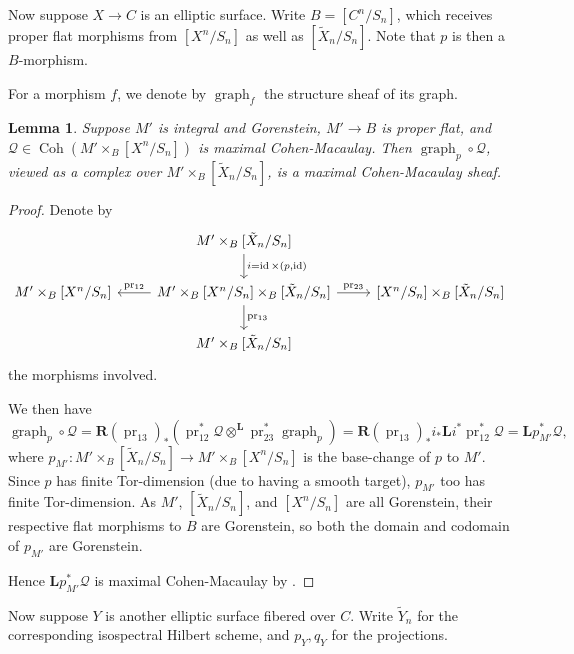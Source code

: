 \documentclass{amsart}
\theoremstyle{plain}
\newtheorem{lemma}[theorem]{Lemma}
\theoremstyle{definition}
\theoremstyle{remark}
\begin{document}
    Now suppose $X\to C$ is an elliptic surface.
    Write $B=[C^n/S_n]$, which receives proper flat morphisms from $[X^n/S_n]$ as well as $[\tilde{X}_n/S_n]$.
    Note that $p$ is then a $B$-morphism.

    For a morphism $f$, we denote by $\operatorname{graph}_f$ the structure sheaf of its graph.
    \begin{lemma}
        Suppose $M'$ is integral and Gorenstein, $M'\to B$ is proper flat, and $\mathcal Q\in\operatorname{Coh}(M'\times_B [X^n/S_n])$ is maximal Cohen-Macaulay.
        Then $\operatorname{graph}_p\circ \mathcal Q$, viewed as a complex over $M'\times_B[\tilde{X}_n/S_n]$, is a maximal Cohen-Macaulay sheaf.
    \end{lemma}
    \begin{proof}
        Denote by
        \[
        \begin{tikzcd}
            &M'\times_B{[}\tilde{X}_n/S_n{]}\arrow{d}{i=\operatorname{id}\times (p, \operatorname{id})}&\\
            M'\times_B{[}X^n/S_n{]} & M'\times_B{[}X^n/S_n{]}\times_B{[}\tilde{X}_n/S_n{]}\arrow{r}{\operatorname{pr_{23}}}\arrow{d}{\operatorname{pr_{13}}}\arrow[swap]{l}{\operatorname{pr_{12}}} & {[}X^n/S_n{]}\times_B{[}\tilde{X}_n/S_n{]}\\
            & M'\times_B{[}\tilde{X}_n/S_n{]} &
        \end{tikzcd}
        \]
        the morphisms involved.

        We then have
        \[\operatorname{graph}_p\circ \mathcal Q=\mathbf R(\operatorname{pr}_{13})_\ast(\operatorname{pr}_{12}^\ast\mathcal Q\otimes^{\mathbf L}\operatorname{pr}_{23}^\ast\operatorname{graph}_p)=\mathbf R(\operatorname{pr}_{13})_\ast i_\ast\mathbf L i^\ast\operatorname{pr}_{12}^\ast\mathcal Q=\mathbf Lp_{M'}^\ast\mathcal Q,\]
        where $p_{M'}:M'\times_B[\tilde{X}_n/S_n]\to M'\times_B[X^n/S_n]$ is the base-change of $p$ to $M'$.
        Since $p$ has finite Tor-dimension (due to having a smooth target), $p_{M'}$ too has finite Tor-dimension.
        As $M'$, $[\tilde{X}_n/S_n]$, and $[X^n/S_n]$ are all Gorenstein, their respective flat morphisms to $B$ are Gorenstein, so both the domain and codomain of $p_{M'}$ are Gorenstein.

        Hence $\mathbf Lp_{M'}^\ast\mathcal Q$ is maximal Cohen-Macaulay by \cite[Lemma~2.3]{arinkin}.
    \end{proof}
    Now suppose $Y$ is another elliptic surface fibered over $C$.
    Write $\tilde{Y}_n$ for the corresponding isospectral Hilbert scheme, and $p_Y,q_Y$ for the projections.
\end{document}
